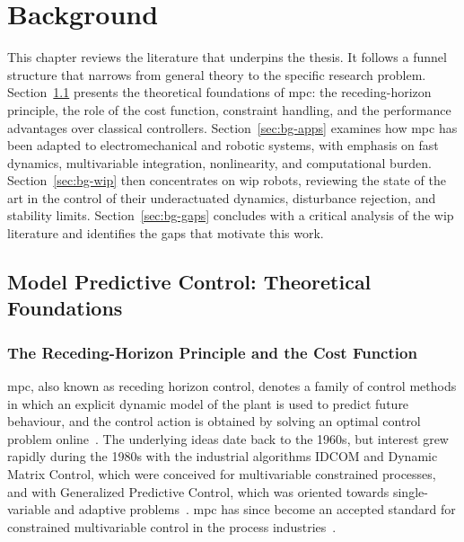 \chapter{Background}\label{chap:background}

This chapter reviews the literature that underpins the thesis. It follows a funnel structure that narrows from general theory to the specific research problem. Section~\ref{sec:bg-mpc} presents the theoretical foundations of \ac{mpc}: the receding-horizon principle, the role of the cost function, constraint handling, and the performance advantages over classical controllers. Section~\ref{sec:bg-apps} examines how \ac{mpc} has been adapted to electromechanical and robotic systems, with emphasis on fast dynamics, multivariable integration, nonlinearity, and computational burden. Section~\ref{sec:bg-wip} then concentrates on \ac{wip} robots, reviewing the state of the art in the control of their underactuated dynamics, disturbance rejection, and stability limits. Section~\ref{sec:bg-gaps} concludes with a critical analysis of the \ac{wip} literature and identifies the gaps that motivate this work.

\section{Model Predictive Control: Theoretical Foundations}\label{sec:bg-mpc}

\subsection{The Receding-Horizon Principle and the Cost Function}\label{sec:bg-mpc-mechanics}

\ac{mpc}, also known as receding horizon control, denotes a family of control methods in which an explicit dynamic model of the plant is used to predict future behaviour, and the control action is obtained by solving an optimal control problem online~\cite{rawlings2000,bemporad1999}. The underlying ideas date back to the 1960s, but interest grew rapidly during the 1980s with the industrial algorithms IDCOM and Dynamic Matrix Control, which were conceived for multivariable constrained processes, and with Generalized Predictive Control, which was oriented towards single-variable and adaptive problems~\cite{bemporad1999}. \ac{mpc} has since become an accepted standard for constrained multivariable control in the process industries~\cite{bemporad1999,schwenzer2021}.

